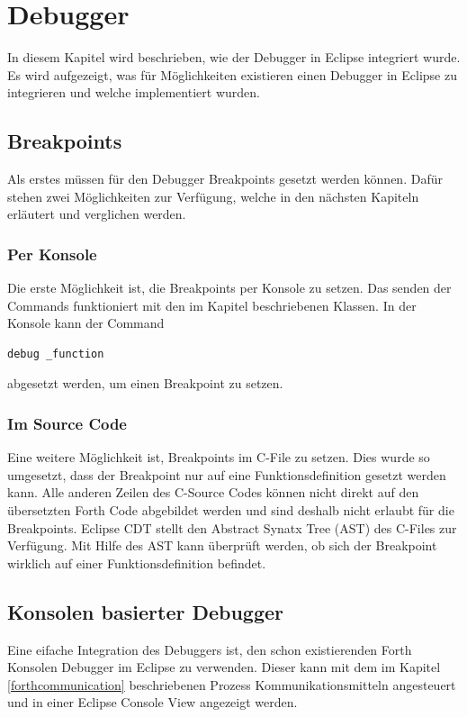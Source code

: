 \chapter{Debugger}
\label{chap:debugger}
In diesem Kapitel wird beschrieben, wie der Debugger in Eclipse integriert wurde. Es wird aufgezeigt, was für Möglichkeiten existieren einen Debugger in Eclipse zu integrieren und welche implementiert wurden.

\section{Breakpoints}
Als erstes müssen für den Debugger Breakpoints gesetzt werden können. Dafür stehen zwei Möglichkeiten zur Verfügung, welche in den nächsten Kapiteln erläutert und verglichen werden.

\subsection{Per Konsole}

Die erste Möglichkeit ist, die Breakpoints per Konsole zu setzen. Das senden der Commands funktioniert mit den im Kapitel  beschriebenen Klassen. In der Konsole kann der Command

%
\begin{verbatim}
debug _function
\end{verbatim}
%
abgesetzt werden, um einen Breakpoint zu setzen.

\subsection{Im Source Code}

Eine weitere Möglichkeit ist, Breakpoints im C-File zu setzen. Dies wurde so umgesetzt, dass der Breakpoint nur auf eine Funktionsdefinition gesetzt werden kann. Alle anderen Zeilen des C-Source Codes können nicht direkt auf den übersetzten Forth Code abgebildet werden und sind deshalb nicht erlaubt für die Breakpoints.
\newline
Eclipse CDT stellt den Abstract Synatx Tree (AST) des C-Files zur Verfügung. Mit Hilfe des AST kann überprüft werden, ob sich der Breakpoint wirklich auf einer Funktionsdefinition befindet.
\newpage
\section{Konsolen basierter Debugger}

Eine eifache Integration des Debuggers ist, den schon existierenden Forth Konsolen Debugger im Eclipse zu verwenden. Dieser kann mit dem im Kapitel \ref{forthcommunication} beschriebenen Prozess Kommunikationsmitteln angesteuert und in einer Eclipse Console View angezeigt werden.


